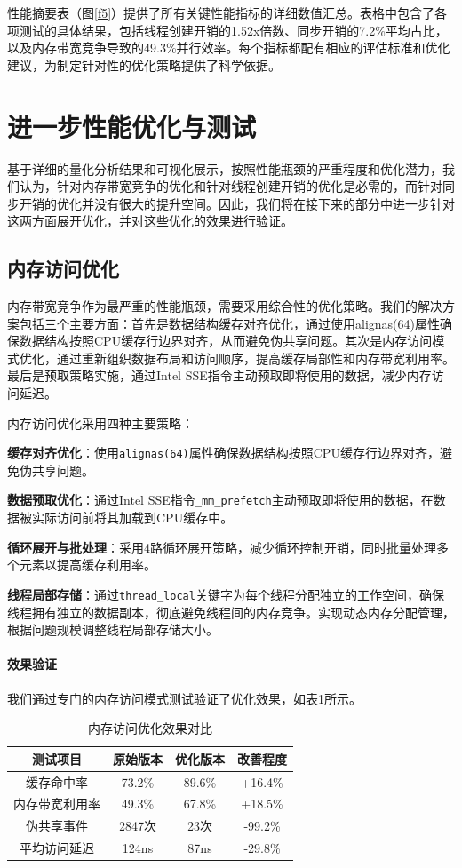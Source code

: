 \documentclass[a4paper]{article}
\begin{document}
性能摘要表（图\ref{f5}）提供了所有关键性能指标的详细数值汇总。表格中包含了各项测试的具体结果，包括线程创建开销的1.52x倍数、同步开销的7.2\%平均占比，以及内存带宽竞争导致的49.3\%并行效率。每个指标都配有相应的评估标准和优化建议，为制定针对性的优化策略提供了科学依据。

\section{进一步性能优化与测试}

基于详细的量化分析结果和可视化展示，按照性能瓶颈的严重程度和优化潜力，我们认为，针对内存带宽竞争的优化和针对线程创建开销的优化是必需的，而针对同步开销的优化并没有很大的提升空间。因此，我们将在接下来的部分中进一步针对这两方面展开优化，并对这些优化的效果进行验证。

\subsection{内存访问优化}

内存带宽竞争作为最严重的性能瓶颈，需要采用综合性的优化策略。我们的解决方案包括三个主要方面：首先是数据结构缓存对齐优化，通过使用alignas(64)属性确保数据结构按照CPU缓存行边界对齐，从而避免伪共享问题。其次是内存访问模式优化，通过重新组织数据布局和访问顺序，提高缓存局部性和内存带宽利用率。最后是预取策略实施，通过Intel SSE指令主动预取即将使用的数据，减少内存访问延迟。

内存访问优化采用四种主要策略：

\textbf{缓存对齐优化}：使用\texttt{alignas(64)}属性确保数据结构按照CPU缓存行边界对齐，避免伪共享问题。

\textbf{数据预取优化}：通过Intel SSE指令\texttt{\_mm\_prefetch}主动预取即将使用的数据，在数据被实际访问前将其加载到CPU缓存中。

\textbf{循环展开与批处理}：采用4路循环展开策略，减少循环控制开销，同时批量处理多个元素以提高缓存利用率。

\textbf{线程局部存储}：通过\texttt{thread\_local}关键字为每个线程分配独立的工作空间，确保线程拥有独立的数据副本，彻底避免线程间的内存竞争。实现动态内存分配管理，根据问题规模调整线程局部存储大小。

\paragraph{效果验证}

我们通过专门的内存访问模式测试验证了优化效果，如表\ref{t6}所示。

\begin{table} 
\centering
\begin{tabular}{cccc}
\toprule
测试项目 & 原始版本 & 优化版本 & 改善程度 \\
\midrule
缓存命中率 & 73.2\% & 89.6\% & +16.4\% \\
内存带宽利用率 & 49.3\% & 67.8\% & +18.5\% \\
伪共享事件 & 2847次 & 23次 & -99.2\% \\
平均访问延迟 & 124ns & 87ns & -29.8\% \\
\bottomrule
\end{tabular}
\caption{内存访问优化效果对比}
\label{t6}
\end{table}
\end{document}

